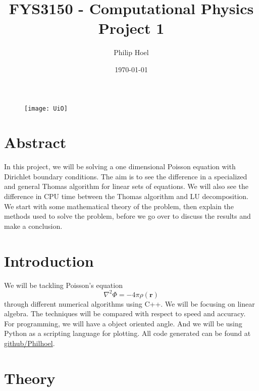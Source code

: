 \documentclass{article}
\title{FYS3150 - Computational Physics \\ Project 1}
\author{Philip Hoel}
\date{\today}
\begin{document}
\maketitle

\begin{figure}
    \texttt{[image: UiO]}
\end{figure}

\newpage

\tableofcontents
\newpage

\section{Abstract}
In this project, we will be solving a one dimensional Poisson equation with Dirichlet boundary conditions. The aim is to see the difference in a specialized and general Thomas algorithm for linear sets of equations. We will also see the difference in CPU time between the Thomas algorithm and LU decomposition. We start with some mathematical theory of the problem, then explain the methods used to solve the problem, before we go over to discuss the results and make a conclusion.

\section{Introduction}
We will be tackling Poisson's equation
$$\nabla^{2}\Phi = -4\pi\rho(\mathbf{r})$$
through different numerical algorithms using C++.
We will be focusing on linear algebra. The techniques will be compared with respect to speed and accuracy. \\
For programming, we will have a object oriented angle. And we will be using Python as a scripting language for plotting. All code generated can be found at \href{https://github.com/philhoel/Computational-Physics}{github/Philhoel}.

\newpage
\section{Theory}
\end{document}

